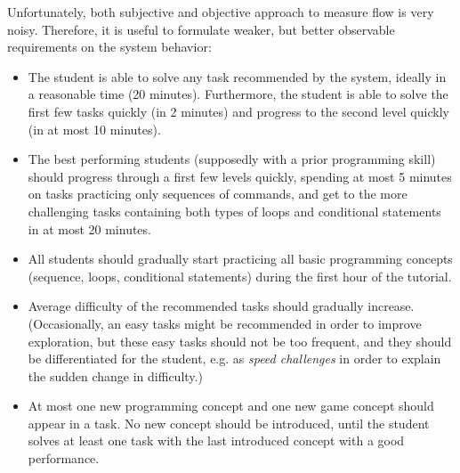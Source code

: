 Unfortunately, both subjective and objective approach to measure flow
is very noisy. Therefore, it is useful to formulate weaker, but better observable
requirements on the system behavior:
\begin{itemize}
\item The student is able to solve any task recommended by the system, ideally
  in a reasonable time (20 minutes).
    Furthermore, the student is able to solve the first few tasks quickly
    (in 2 minutes) and progress to the second level quickly (in at most 10
    minutes).
\item The best performing students (supposedly with a prior programming skill)
should progress through a first few levels quickly, spending at most 5 minutes
on tasks practicing only sequences of commands, and get to the more
challenging tasks containing both types of loops and conditional statements
in at most 20 minutes.  %
\item All students should gradually start practicing all basic programming concepts
  (sequence, loops, conditional statements) during the first hour of the tutorial.
\item Average difficulty of the recommended tasks should gradually increase.
  (Occasionally, an easy tasks might be recommended in order to improve
  exploration, but these easy tasks should
  not be too frequent, and they should be differentiated for the student,
  e.g. as \emph{speed challenges} in order to explain the sudden change in
  difficulty.)
\item At most one new programming concept and one new game concept should appear
  in a task. No new concept should be introduced, until the student
  solves at least one task with the last introduced concept with a good
  performance. %

\end{itemize}
